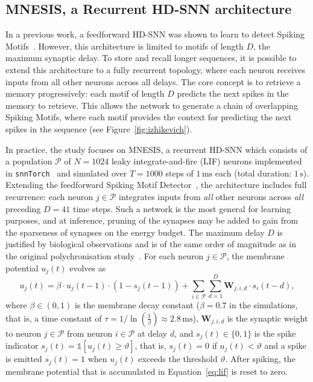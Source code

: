 \documentclass{scrartcl}
\newcommand{\citep}[1]{\parencite{#1}}
\begin{document}
\subsection{MNESIS, a Recurrent HD-SNN architecture} %

In a previous work, a feedforward HD-SNN was shown to learn to detect Spiking Motifs~\citep{Perrinet2023}. However, this architecture is limited to motifs of length $D$, the maximum synaptic delay. To store and recall longer sequences, it is possible to extend this architecture to a fully recurrent topology, where each neuron receives inputs from all other neurons across all delays. The core concept is to retrieve a memory progressively: each motif of length $D$ predicts the next spikes in the memory to retrieve. This allows the network to generate a chain of overlapping Spiking Motifs, where each motif provides the context for predicting the next spikes in the sequence (see Figure~\ref{fig:izhikevich}).

In practice, the study focuses on MNESIS, a recurrent HD-SNN which consists of a population $\mathcal{P}$ of $N = 1024$ leaky integrate-and-fire (LIF) neurons implemented in \texttt{snnTorch}~\citep{Eshraghian2023} and simulated over $T = 1000$ steps of $1\,\mathrm{ms}$ each (total duration: $1\,\mathrm{s}$). Extending the feedforward Spiking Motif Detector~\citep{Perrinet2023}, the architecture includes full recurrence: each neuron $j \in \mathcal{P}$  integrates inputs from \emph{all} other neurons across \emph{all} preceding $D = 41$ time steps. Such a network is the most general for learning purposes, and at inference, pruning of the synapses may be added to gain from the sparseness of synapses on the energy budget. The maximum delay $D$ is justified by biological observations and is of the same order of magnitude as in the original polychronisation study~\citep{Izhikevich2006}. For each neuron $j \in \mathcal{P}$, the membrane potential $u_j(t)$ evolves as
\begin{equation}
  u_j(t)
  = \beta \cdot u_j(t-1) \cdot (1 - s_j(t-1))
    + \sum_{i \in \mathcal{P}}
      \sum_{d=1}^{D} \mathbf{W}_{j, i, d} \cdot s_i(t-d) ,
  \label{eq:lif}
\end{equation}
where $\beta \in (0,1)$ is the membrane decay constant ($\beta = 0.7$ in the simulations, that is, a time constant of $\tau= 1 / \ln(\frac 1 \beta) \approx 2.8\,\mathrm{ms}$), $\mathbf{W}_{j, i, d}$ is the synaptic weight to neuron $j \in \mathcal{P}$ from neuron $i \in \mathcal{P}$ at delay $d$, and $s_j(t) \in \{0,1\}$  is the spike indicator $s_j(t) = \mathds{1}[u_j(t) \geq \vartheta]$, that is, $s_j(t)=0$ if $u_j(t) < \vartheta$ and a spike is emitted $s_j(t)=1$ when $u_j(t)$ exceeds the threshold $\vartheta$. After spiking, the membrane potential that is accumulated in Equation~\ref{eq:lif} is reset to zero.
\end{document}
